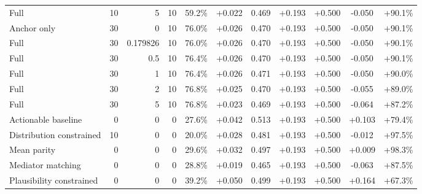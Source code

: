 \begin{table}[htbp]
\begin{tabular}{lrrrccccccc}
Full & 10 & 5 & 10 & 59.2\% & +0.022 & 0.469 & +0.193 & +0.500 & -0.050 & +90.1\% \\
Anchor only & 30 & 0 & 10 & 76.0\% & +0.026 & 0.470 & +0.193 & +0.500 & -0.050 & +90.1\% \\
Full & 30 & 0.179826 & 10 & 76.0\% & +0.026 & 0.470 & +0.193 & +0.500 & -0.050 & +90.1\% \\
Full & 30 & 0.5 & 10 & 76.4\% & +0.026 & 0.470 & +0.193 & +0.500 & -0.050 & +90.1\% \\
Full & 30 & 1 & 10 & 76.4\% & +0.026 & 0.471 & +0.193 & +0.500 & -0.050 & +90.0\% \\
Full & 30 & 2 & 10 & 76.8\% & +0.025 & 0.470 & +0.193 & +0.500 & -0.055 & +89.0\% \\
Full & 30 & 5 & 10 & 76.8\% & +0.023 & 0.469 & +0.193 & +0.500 & -0.064 & +87.2\% \\
Actionable baseline & 0 & 0 & 0 & 27.6\% & +0.042 & 0.513 & +0.193 & +0.500 & +0.103 & +79.4\% \\
Distribution constrained & 10 & 0 & 0 & 20.0\% & +0.028 & 0.481 & +0.193 & +0.500 & -0.012 & +97.5\% \\
Mean parity & 0 & 0 & 0 & 29.6\% & +0.032 & 0.497 & +0.193 & +0.500 & +0.009 & +98.3\% \\
Mediator matching & 0 & 0 & 0 & 28.8\% & +0.019 & 0.465 & +0.193 & +0.500 & -0.063 & +87.5\% \\
Plausibility constrained & 0 & 0 & 0 & 39.2\% & +0.050 & 0.499 & +0.193 & +0.500 & +0.164 & +67.3\% \\
\bottomrule
\end{tabular}
\end{table}